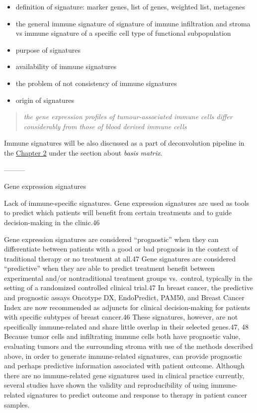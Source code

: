 \documentclass[12pt,]{book}
\providecommand{\tightlist}{%
  \setlength{\itemsep}{0pt}\setlength{\parskip}{0pt}}
\theoremstyle{definition}
\theoremstyle{definition}
\theoremstyle{definition}
\theoremstyle{remark}
\begin{document}
\begin{itemize}
\tightlist
\item
  definition of signature: marker genes, list of genes, weighted list,
  metagenes
\item
  the general immune signature of signature of immune infiltration and
  stroma vs immune signature of a specific cell type of functional
  subpopulation
\item
  purpose of signatures
\item
  availability of immune signatures
\item
  the problem of not consistency of immune signatures
\item
  origin of signatures
\end{itemize}

\begin{quote}
\emph{the gene expression profiles of tumour-associated immune cells
differ considerably from those of blood derived immune cells}
\citep{Schelker2017}
\end{quote}

Immune signatures will be also discussed as a part of deconvolution
pipeline in the \protect\hyperlink{methods}{Chapter 2} under the section
about \emph{basis matrix}.

---------

Gene expression signatures

Lack of immune-specific signatures. Gene expression signatures are used
as tools to predict which patients will benefit from certain treatments
and to guide decision-making in the clinic.46

Gene expression signatures are considered ``prognostic'' when they can
differentiate between patients with a good or bad prognosis in the
context of traditional therapy or no treatment at all.47 Gene signatures
are considered ``predictive'' when they are able to predict treatment
benefit between experimental and/or nontraditional treatment groups
vs.~control, typically in the setting of a randomized controlled
clinical trial.47 In breast cancer, the predictive and prognostic assays
Oncotype DX, EndoPredict, PAM50, and Breast Cancer Index are now
recommended as adjuncts for clinical decision-making for patients with
specific subtypes of breast cancer.46 These signatures, however, are not
specifically immune-related and share little overlap in their selected
genes.47, 48 Because tumor cells and infiltrating immune cells both have
prognostic value, evaluating tumors and the surrounding stroma with use
of the methods described above, in order to generate immune-related
signatures, can provide prognostic and perhaps predictive information
associated with patient outcome. Although there are no immune-related
gene signatures used in clinical practice currently, several studies
have shown the validity and reproducibility of using immune-related
signatures to predict outcome and response to therapy in patient cancer
samples.
\end{document}
